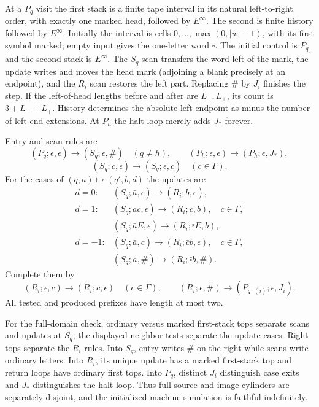 At a $P_q$ visit the first stack is a finite tape interval in its natural
left-to-right order, with exactly one marked head, followed by $E^\infty$.
The second is finite history followed by $E^\infty$.  Initially the
interval is cells $0,\ldots,\max(0,|w|-1)$, with its first symbol marked;
empty input gives the one-letter word $\bar\square$.  The initial
control is $P_{q_0}$ and the second stack is $E^\infty$.
The $S_q$ scan transfers the word left of the mark, the update writes and
moves the head mark (adjoining a blank precisely at an endpoint), and the
$R_i$ scan restores the left part.  Replacing $\#$ by $J_i$ finishes
the step.  If the left-of-head lengths before and after are $L_-,L_+$,
its count is $3+L_-+L_+$.  History determines the absolute left endpoint
as minus the number of left-end extensions.  At $P_h$ the halt loop
merely adds $J_*$ forever.

Entry and scan rules are
\[
 (P_q;\epsilon,\epsilon)\to(S_q;\epsilon,\#)\quad(q\ne h),\qquad
 (P_h;\epsilon,\epsilon)\to(P_h;\epsilon,J_*),
\]
\[
 (S_q;c,\epsilon)\to(S_q;\epsilon,c)\quad(c\in\Gamma).
\]
For the cases of $(q,a)\mapsto(q',b,d)$ the updates are
\[
\begin{array}{ll}
 d=0:&(S_q;\bar a,\epsilon)\to(R_i;\bar b,\epsilon),\\
 d=1:&(S_q;\bar a c,\epsilon)\to(R_i;\bar c,b),\quad c\in\Gamma,\\
     &(S_q;\bar a E,\epsilon)\to(R_i;\bar\square E,b),\\
 d=-1:&(S_q;\bar a,c)\to(R_i;\bar c b,\epsilon),\quad c\in\Gamma,\\
     &(S_q;\bar a,\#)\to(R_i;\bar\square b,\#).
\end{array}
\]
Complete them by
\[
 (R_i;\epsilon,c)\to(R_i;c,\epsilon)\quad(c\in\Gamma),\qquad
 (R_i;\epsilon,\#)\to(P_{q^+(i)};\epsilon,J_i).
\]
All tested and produced prefixes have length at most two.

For the full-domain check, ordinary versus marked first-stack tops
separate scans and updates at $S_q$; the displayed neighbor tests separate
the update cases.  Right tops separate the $R_i$ rules.  Into $S_q$,
entry writes $\#$ on the right while scans write ordinary letters.
Into $R_i$, its unique update has a marked first-stack top and return
loops have ordinary first tops.  Into $P_q$, distinct $J_i$ distinguish
case exits and $J_*$ distinguishes the halt loop.  Thus full source and
image cylinders are separately disjoint, and the initialized machine
simulation is faithful indefinitely.

